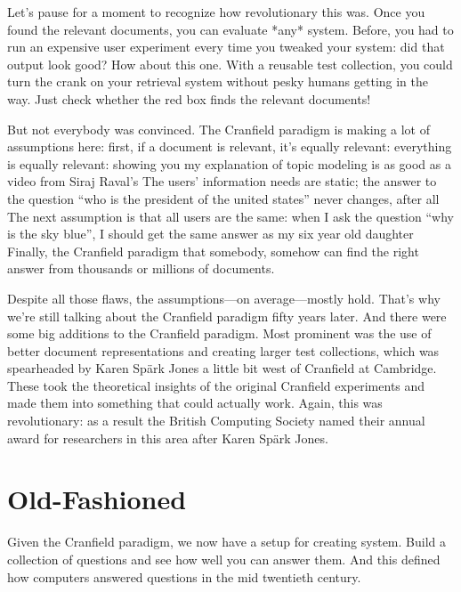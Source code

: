 Let’s pause for a moment to recognize how revolutionary this was.  Once you found the relevant documents, you can evaluate *any* system.  Before, you had to run an expensive user experiment every time you tweaked your system: did that output look good?  How about this one.  With a reusable test collection, you could turn the crank on your retrieval system without pesky humans getting in the way.  Just check whether the red box finds the relevant documents!

But not everybody was convinced.  The Cranfield paradigm is making a lot of assumptions here: 
first, if a document is relevant, it’s equally relevant: everything is equally relevant: showing you my explanation of topic modeling is as good as a video from Siraj Raval’s
The users’ information needs are static; the answer to the question “who is the president of the united states” never changes, after all
The next assumption is that all users are the same: when I ask the question “why is the sky blue”, I should get the same answer as my six year old daughter
Finally, the Cranfield paradigm that somebody, somehow can find the right answer from thousands or millions of documents.

Despite all those flaws, the assumptions—on average—mostly hold.  That’s why we’re still talking about the Cranfield paradigm fifty years later.  And there were some big additions to the Cranfield paradigm.  Most prominent was the use of better document representations and creating larger test collections, which was spearheaded by Karen Spärk Jones a little bit west of Cranfield at Cambridge.  These took the theoretical insights of the original Cranfield experiments and made them into something that could actually work.  Again, this was revolutionary: as a result the British Computing Society named their annual award for researchers in this area after Karen Spärk Jones.

\section{Old-Fashioned }
\label{sec:ir:gofai-qa}

Given the Cranfield paradigm, we now have a setup for creating 
system.
%
Build a collection of questions and see how well you can answer them.
%
And this defined how computers answered questions in the mid twentieth century.


